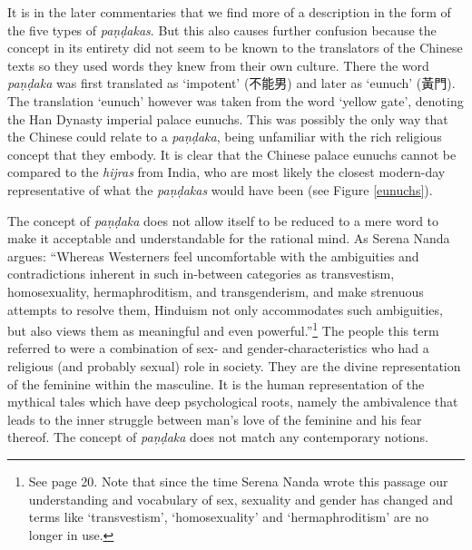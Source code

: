It is in the later commentaries that we find more of a description in the form of the five types of {\em paṇḍakas}. But this also causes further confusion because the concept in its entirety did not seem to be known to the translators of the Chinese texts so they used words they knew from their own culture. There the word {\em paṇḍaka} was first translated as `impotent' (不能男) and later as `eunuch' (黃門). The translation `eunuch' however was taken from the word `yellow gate', denoting the Han Dynasty imperial palace eunuchs. This was possibly the only way that the Chinese could relate to a {\em paṇḍaka}, being unfamiliar with the rich religious concept that they embody. It is clear that the Chinese palace eunuchs cannot be compared to the {\em hijras} from India, who are most likely the closest modern-day representative of what the {\em paṇḍakas} would have been (see Figure \ref{eunuchs}).

The concept of {\em paṇḍaka} does not allow itself to be reduced to a mere word to make it acceptable and understandable for the rational mind. As Serena Nanda argues: ``Whereas Westerners feel uncomfortable with the ambiguities and contradictions inherent in such in-between categories as transvestism, homosexuality, hermaphroditism, and transgenderism, and make strenuous attempts to resolve them, Hinduism not only accommodates such ambiguities, but also views them as meaningful and even powerful.''\footnote{See \cite{nanda} page 20. Note that since the time Serena Nanda wrote this passage our understanding and vocabulary of sex, sexuality and gender has changed and terms like `transvestism', `homosexuality' and `hermaphroditism' are no longer in use.} The people this term referred to were a combination of sex- and gender-characteristics who had a religious (and probably sexual) role in society. They are the divine representation of the feminine within the masculine. It is the human representation of the mythical tales which have deep psychological roots, namely the ambivalence that leads to the inner struggle between man's love of the feminine and his fear thereof. The concept of {\em paṇḍaka} does not match any contemporary notions. 
